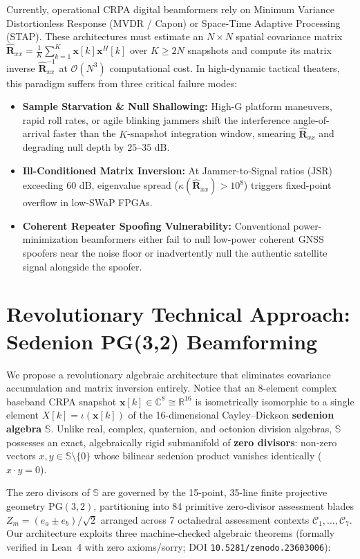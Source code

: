 \documentclass[12pt,letterpaper]{article}
\begin{document}
Currently, operational CRPA digital beamformers rely on Minimum Variance Distortionless Response (MVDR / Capon) or Space-Time Adaptive Processing (STAP). These architectures must estimate an $N\times N$ spatial covariance matrix $\hat{\mathbf{R}}_{xx} = \frac{1}{K}\sum_{k=1}^K \mathbf{x}[k]\mathbf{x}^H[k]$ over $K \ge 2N$ snapshots and compute its matrix inverse $\hat{\mathbf{R}}_{xx}^{-1}$ at $\mathcal{O}(N^3)$ computational cost. In high-dynamic tactical theaters, this paradigm suffers from three critical failure modes:
\begin{itemize}[leftmargin=16pt,itemsep=1pt,topsep=1pt]
    \item \textbf{Sample Starvation \& Null Shallowing:} High-G platform maneuvers, rapid roll rates, or agile blinking jammers shift the interference angle-of-arrival faster than the $K$-snapshot integration window, smearing $\hat{\mathbf{R}}_{xx}$ and degrading null depth by $25\text{--}35\text{ dB}$.
    \item \textbf{Ill-Conditioned Matrix Inversion:} At Jammer-to-Signal ratios ($\mathrm{JSR}$) exceeding $60\text{ dB}$, eigenvalue spread ($\kappa(\hat{\mathbf{R}}_{xx}) > 10^8$) triggers fixed-point overflow in low-SWaP FPGAs.
    \item \textbf{Coherent Repeater Spoofing Vulnerability:} Conventional power-minimization beamformers either fail to null low-power coherent GNSS spoofers near the noise floor or inadvertently null the authentic satellite signal alongside the spoofer.
\end{itemize}

\section{Revolutionary Technical Approach: Sedenion PG(3,2) Beamforming}
We propose a revolutionary algebraic architecture that eliminates covariance accumulation and matrix inversion entirely. Notice that an 8-element complex baseband CRPA snapshot $\mathbf{x}[k] \in \mathbb{C}^8 \cong \mathbb{R}^{16}$ is isometrically isomorphic to a single element $X[k] = \iota(\mathbf{x}[k])$ of the 16-dimensional Cayley--Dickson \textbf{sedenion algebra} $\mathbb{S}$. Unlike real, complex, quaternion, and octonion division algebras, $\mathbb{S}$ possesses an exact, algebraically rigid submanifold of \textbf{zero divisors}: non-zero vectors $x, y \in \mathbb{S}\setminus\{0\}$ whose bilinear sedenion product vanishes identically ($x \cdot y = 0$).

The zero divisors of $\mathbb{S}$ are governed by the 15-point, 35-line finite projective geometry $\mathrm{PG}(3,2)$, partitioning into 84 primitive zero-divisor assessment blades $Z_m = (e_a \pm e_b)/\sqrt{2}$ arranged across 7 octahedral assessment contexts $\mathcal{C}_1,\dots,\mathcal{C}_7$. Our architecture exploits three machine-checked algebraic theorems (formally verified in Lean~4 with zero axioms/sorry; DOI \texttt{10.5281/zenodo.23603006}):
\end{document}
